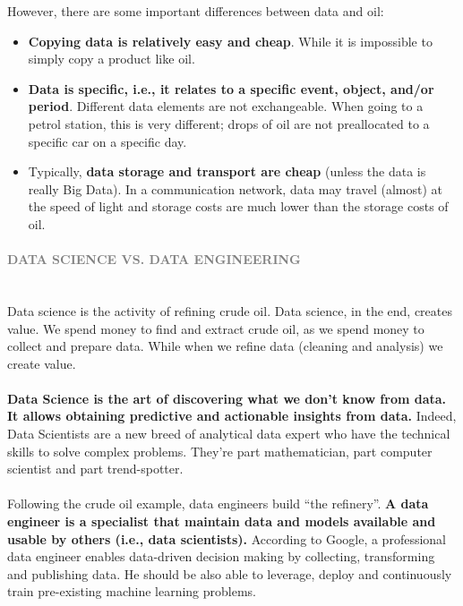\documentclass[10pt,a4paper]{article}
\newcommand{\nline}{\\~\\}
\newcommand{\myparagraph}[1]{\paragraph{\normalsize{\textcolor{gray}{\uppercase{\textbf{#1}}}} }\mbox{} \vspace{0.5em}\\}
\begin{document}
\pagebreak However, there are some important differences between data and oil:
\begin{itemize}
	\item \textbf{Copying data is relatively easy and cheap}. While it is impossible to simply copy a product like oil.
	\item \textbf{Data is specific, i.e., it relates to a specific event, object, and/or period}. Different data elements are not exchangeable. When going to a petrol station, this is very different; drops of oil are not preallocated to a specific car on a specific day.
	\item Typically, \textbf{data storage and transport are cheap} (unless the data is really Big Data). In a communication network, data may travel (almost) at the speed of light and storage costs are much lower than the storage costs of oil.
\end{itemize}
\myparagraph{Data Science vs. Data Engineering}
Data science is the activity of refining crude oil. Data science, in the end, creates value. We spend money to find and extract crude oil, as we spend money to collect and prepare data. While when we refine data (cleaning and analysis) we create value.
\nline
\textbf{Data Science is the art of discovering what we don’t know from data. It allows obtaining predictive and actionable insights from data.} Indeed, Data Scientists are a new breed of analytical data expert who have the technical skills to solve complex problems. They’re part mathematician, part computer scientist and part trend-spotter. 
\nline
Following the crude oil example, data engineers build “the refinery”. \textbf{A data engineer is a specialist that maintain data and models available and usable by others (i.e., data scientists).} According to Google, a professional data engineer enables data-driven decision making by collecting, transforming and publishing data. He should be also able to leverage, deploy and continuously train pre-existing machine learning problems.
\end{document}
